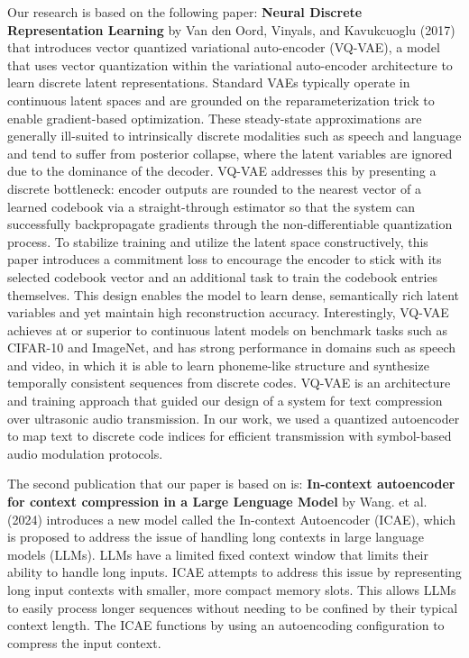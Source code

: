 \documentclass[12pt,openany]{article}
\theoremstyle{definition}
\theoremstyle{definition}
\theoremstyle{definition}
\begin{document}
Our research is based on the following paper:
\textbf{ Neural Discrete Representation Learning } by \cite{oord2017neural} Van den Oord, Vinyals, and Kavukcuoglu (2017) that introduces vector quantized variational auto-encoder (VQ-VAE), a model that uses vector quantization within the variational auto-encoder architecture to learn discrete latent representations. Standard VAEs typically operate in continuous latent spaces and are grounded on the reparameterization trick to enable gradient-based optimization. These steady-state approximations are generally ill-suited to intrinsically discrete modalities such as speech and language and tend to suffer from posterior collapse, where the latent variables are ignored due to the dominance of the decoder. VQ-VAE addresses this by presenting a discrete bottleneck: encoder outputs are rounded to the nearest vector of a learned codebook via a straight-through estimator so that the system can successfully backpropagate gradients through the non-differentiable quantization process.
To stabilize training and utilize the latent space constructively, this paper introduces a commitment loss to encourage the encoder to stick with its selected codebook vector and an additional task to train the codebook entries themselves. This design enables the model to learn dense, semantically rich latent variables and yet maintain high reconstruction accuracy. Interestingly, VQ-VAE achieves at or superior to continuous latent models on benchmark tasks such as CIFAR-10 and ImageNet, and has strong performance in domains such as speech and video, in which it is able to learn phoneme-like structure and synthesize temporally consistent sequences from discrete codes.
VQ-VAE is an architecture and training approach that guided our design of a system for text compression over ultrasonic audio transmission. In our work, we used a quantized autoencoder to map text to discrete code indices for efficient transmission with symbol-based audio modulation protocols.

\vspace{0.5 cm}

The second publication that our paper is based on is: \textbf{ In-context autoencoder for context compression in a Large Lenguage Model} by Wang. et al. (2024) \cite{ge2023incontext} introduces a new model called the In-context Autoencoder (ICAE), which is proposed to address the issue of handling long contexts in large language models (LLMs). LLMs have a limited fixed context window that limits their ability to handle long inputs. ICAE attempts to address this issue by representing long input contexts with smaller, more compact memory slots. This allows LLMs to easily process longer sequences without needing to be confined by their typical context length. The ICAE functions by using an autoencoding configuration to compress the input context.
\end{document}
